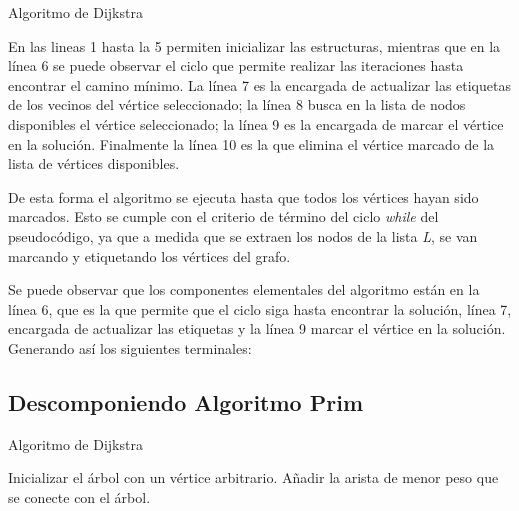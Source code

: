 \begin{algorithm}[H]
    \begin{algorithmic}[1]
        \ENDWHILE
    \end{algorithmic}
    \caption{Algoritmo de Dijkstra}\label{alg:alg41}
\end{algorithm}

En las lineas 1 hasta la 5 permiten inicializar las estructuras, mientras que en la línea 6 se puede observar el ciclo que permite realizar las iteraciones hasta encontrar el camino mínimo. La línea 7 es la encargada de actualizar las etiquetas de los vecinos del vértice seleccionado; la línea 8 busca en la lista de nodos disponibles el vértice seleccionado; la línea 9 es la encargada de marcar el vértice en la solución. Finalmente la línea 10 es la que elimina el vértice marcado de la lista de vértices disponibles.

De esta forma el algoritmo se ejecuta hasta que todos los vértices hayan sido marcados. Esto se cumple con el criterio de término del ciclo \emph{while} del pseudocódigo, ya que a medida que se extraen los nodos de la lista \emph{L}, se van marcando y etiquetando los vértices del grafo.

Se puede observar que los componentes elementales del algoritmo están en la línea 6, que es la que permite que el ciclo siga hasta encontrar la solución, línea 7, encargada de actualizar las etiquetas y la línea 9  marcar el vértice en la solución. Generando así los siguientes terminales:




\subsection{Descomponiendo Algoritmo Prim}
\begin{algorithm}[H]
    \caption{Algoritmo de Dijkstra}\label{alg:alg41}
    \begin{algorithmic}[1]
        \STATE Inicializar el árbol con un vértice arbitrario.
            \STATE Añadir la arista de menor peso que se conecte con el árbol.
        \ENDWHILE
    \end{algorithmic}
\end{algorithm}

